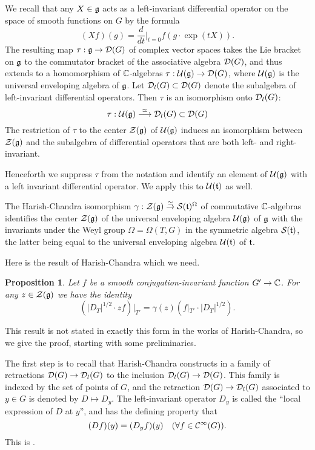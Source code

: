 \documentclass{article}
\newtheorem{pro}[thm]{Proposition}
\theoremstyle{definition}
\numberwithin{equation}{section}
\renewcommand{\-}{\hyp{}}
\newcommand{\g}{\mathfrak g}
\begin{document}
We recall that any $X \in \mathfrak{g}$ acts as a left-invariant differential operator on the space of smooth functions on $G$ by the formula
\[ (Xf)(g) = \frac{d}{dt}\Big|_{t=0}f(g \cdot \exp(tX)). \]
The resulting map $\tau : \mathfrak{g} \to \mathcal{D}(G)$ of complex vector spaces takes the Lie bracket on $\mathfrak{g}$ to the commutator bracket of the associative algebra $\mathcal{D}(G)$, and thus extends to a homomorphism of $\mathbb{C}$-algebras
$\tau : \mathcal{U}(\mathfrak{g}) \to \mathcal{D}(G)$, where $\mathcal{U}(\mathfrak{g})$ is the universal enveloping algebra of $\mathfrak{g}$.
Let $\mathcal{D}_l(G) \subset \mathcal{D}(G)$ denote the subalgebra of left-invariant differential operators. Then $\tau$ is an isomorphism onto $\mathcal{D}_l(G)$:
\[
\tau : \mathcal{U}(\mathfrak{g}) \overset\simeq\longrightarrow \mathcal{D}_l(G)\subset \mathcal{D}(G)
\]
The restriction of $\tau$ to the center $\mathcal{Z}(\mathfrak{g})$ of $\mathcal{U}(\mathfrak{g})$ induces an isomorphism between $\mathcal{Z}(\mathfrak{g})$ and the subalgebra of differential operators that are both left- and right-invariant.

Henceforth we suppress $\tau$ from the notation and identify an element of $\mc{U}(\g)$ with a left invariant differential operator.
We apply this to $\mathcal{U}(\mathfrak{t})$ as well.

The Harish-Chandra isomorphism  $\gamma : \mathcal{Z}(\mathfrak{g}) \overset\simeq\to \mathcal{S}(\mathfrak{t})^\Omega$ of commutative $\mathbb{C}$-algebras identifies the center $\mathcal{Z}(\mathfrak{g})$ of the universal enveloping algebra $\mathcal{U}(\mathfrak{g})$  of $\mathfrak{g}$ with the invariants under the Weyl group $\Omega=\Omega(T,G)$ in the symmetric algebra $\mathcal{S}(\mathfrak{t})$, the latter being equal to the universal enveloping algebra $\mathcal{U}(\mathfrak{t})$ of $\mathfrak{t}$.

Here is the result of Harish-Chandra which we need.

\begin{pro} \label{pro:diff}
	Let $f$ be a smooth conjugation-invariant function $G' \to \mathbb{C}$. For any $z \in \mathcal{Z}(\mathfrak{g})$ we have the identity
	\[ (|D_T|^{1/2} \cdot zf)|_{T'} =  \gamma(z)(f|_{T'} \cdot |D_T|^{1/2}). \]
\end{pro}

This result is not stated in exactly  this form in the works of Harish-Chandra, so we give the proof, starting with some preliminaries.

The first step is to recall that Harish-Chandra constructs in \cite[\S4]{HC_characters} a family of retractions $\mathcal{D}(G) \to \mathcal{D}_l(G)$ to the inclusion $\mathcal{D}_l(G) \to \mathcal{D}(G)$. This family is indexed by the set of points of $G$, and the retraction $\mathcal{D}(G) \to \mathcal{D}_l(G)$ associated to $y \in G$ is denoted by $D \mapsto D_y$. The left-invariant operator $D_y$ is called the ``local expression of $D$ at $y$'', and has the defining property that 
\begin{equation} \label{eq:diff1}
 (Df)(y) = (D_yf)(y)\quad(\forall f \in \mathcal{C}^\infty(G)).
\end{equation}
This is \cite[\S4, Corollary to Lemma 13, page 112]{HC_characters}.
\end{document}
